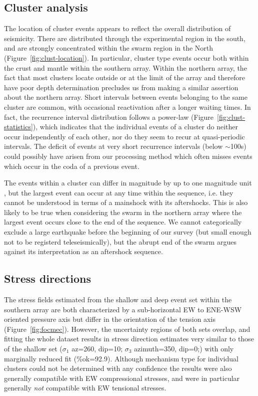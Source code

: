 \documentclass[reviewcopy]{elsart}
\begin{document}
\subsection{Cluster analysis}

The location of cluster events appears to reflect the overall
distribution of seismicity.  There are distributed through the
experimental region in the south, and are strongly concentrated within
the swarm region in the North (Figure~\ref{fig:clust-location}).  In
particular, cluster type events occur both within the crust and mantle
within the southern array.  Within the northern array, the fact that
most clusters locate outside or at the limit of the array and therefore
have poor depth determination precludes us from making a similar
assertion about the northern array.   Short intervals between events
belonging to the same cluster are common, with occasional reactivation
after a longer waiting times.  In fact, the recurrence interval
distribution follows a power-law (Figure~\ref{fig:clust-statistics}),
which indicates that the individual events of a cluster do neither occur
independently of each other, nor do they seem to recur at
quasi-periodic intervals.  The deficit of events at very short
recurrence intervals (below $\sim$100s) could possibly have arisen from our
processing method which often  misses events which occur in the
coda of a previous event.

The events within a cluster can differ in
magnitude by up to one magnitude unit , but the
largest event can occur at any time within the sequence, i.e. they
cannot be understood in terms of a mainshock with its aftershocks.
This is also likely to be true when considering the swarm in the
northern array where the largest event occurs close to the end of the
sequence.  We cannot categorically exclude a large earthquake before
the beginning of our survey (but small enough not to be registerd
teleseismically), but the abrupt end of the swarm argues against its
interpretation as an aftershock sequence.

\subsection{Stress directions}

The stress fields estimated from the shallow and deep event set within
the southern array are both characterized by a sub-horizontal EW to
ENE-WSW oriented pressure axis but differ in the orientation of the
tension axis (Figure~\ref{fig:focmec}). However, the uncertainty
regions of both sets overlap, and fitting the whole dataset results in
stress direction estimates very similar to those of the shallow set
($\sigma_1$ az=260\dg, dip=10\dg; $\sigma_3$ azimuth=350\dg, dip=0\dg;) with only marginally reduced fit
(\%ok=92.9).  Although  mechanism type for individual clusters
could not be determined with any confidence the results were
also generally compatible with EW compressional stresses, and were in
particular generally {\em not} compatible with EW tensional stresses.
\end{document}

